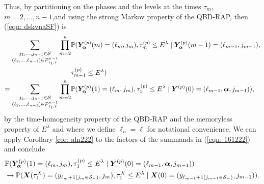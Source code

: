 Thus, by partitioning on the phases and the levels at the times \(\tau_m\), \(m=2,\dots,n-1\),and using the strong Markov property of the QBD-RAP, then (\ref{eqn: dskvnaSF}) is  
	\begin{align}
		\sum_{\substack{j_2,\dots,j_{n-1}\in\mathcal S \\ (\ell_2,\dots,\ell_{n-1}) \in\mathcal P^{n-1}_{\ell_1,\ell}}}\prod_{m=2}^{n}&\mathbb P(\bm{Y}_{\bm{\alpha}}^{(p)}(m) =(\ell_m, j_m), 
		\tau_{m}^{(p)}\leq E^\lambda 
		\mid  \nonumber 
\bm{Y}_{\bm{\alpha}}^{(p)} (m-1) = (\ell_{m-1}, j_{m-1}), \\&\tau_{m-1}^{(p)}\leq E^\lambda ) \nonumber
		\\=\sum_{\substack{j_2,\dots,j_{n-1}\in\mathcal S \\ (\ell_2,\dots,\ell_{n-1}) \in\mathcal P^{n-1}_{\ell_1,\ell}}}\prod_{m=2}^{n}&\mathbb P(\bm{Y}_{\bm{\alpha}}^{(p)}(1) =(\ell_m, j_m), \tau_{1}^{(p)}\leq E^\lambda 
            	 \mid  
	 	\boldsymbol Y^{(p)}(0) = (\ell_{m-1},\boldsymbol \alpha, j_{m-1})),  \label{eqn: 161222}
\end{align}
by the time-homogeneity property of the QBD-RAP and the memoryless property of \(E^\lambda\) and where we define \(\ell_n=\ell\) for notational convenience. %
We can apply Corollary \ref{cor: aln222} to the factors of the summands in (\ref{eqn: 161222}) and conclude 
\begin{align}
	& \mathbb P(\bm{Y}_{\bm{\alpha}}^{(p)}(1) = (\ell_m, j_m), \tau_{1}^{(p)}\leq E^\lambda 
            	 \mid \boldsymbol Y^{(p)}(0) = (\ell_{m-1},\boldsymbol \alpha, j_{m-1}))\nonumber
	\\&\to \mathbb P(\boldsymbol X(\tau_1^X) =( y_{\ell_{m}+1(j_m\in\mathcal{S}_-)},j_m), \tau_{1}^X\leq E^\lambda 
	\mid \boldsymbol X(0) = (y_{\ell_{m-1}+1(j_{m-1}\in\mathcal{S}_-)}, j_{m-1})).  \label{eqn:kknvf fawoprgj v2}
\end{align}

